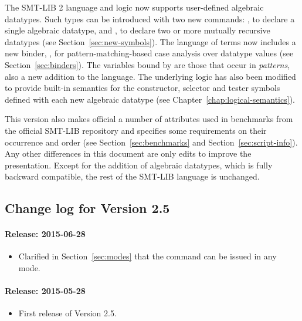 The SMT-LIB 2 language and logic now supports user-defined algebraic datatypes.
Such types can be introduced with two new commands:
, to declare a single algebraic datatype, and
, to declare two or more mutually recursive datatypes
(see Section~\ref{sec:new-symbols}).
The language of terms now includes a new binder, , 
for pattern-matching-based case analysis over datatype values
(see Section~\ref{sec:binders}).
The variables bound by  are those that occur in \emph{patterns},
also a new addition to the language.
The underlying logic has also been modified to provide built-in semantics
for the constructor, selector and tester symbols defined 
with each new algebraic datatype
(see Chapter~\ref{chap:logical-semantics}).

This version also makes official a number of  attributes
used in benchmarks from the official SMT-LIB repository
and specifies some requirements on their occurrence and order
(see Section~\ref{sec:benchmarks} and Section~\ref{sec:script-info}).
Any other differences in this document are only edits to improve 
the presentation.
Except for the addition of algebraic datatypes, 
which is fully backward compatible,
the rest of the SMT-LIB language is unchanged.


\subsection{Change log for Version 2.5}

\paragraph{Release: 2015-06-28}
\begin{itemize}
\item 
Clarified in Section~\ref{sec:modes} that the  command can be issued in any mode.
\end{itemize}


\paragraph{Release: 2015-05-28}
\begin{itemize}
\item 
First release of Version 2.5.
\end{itemize}

